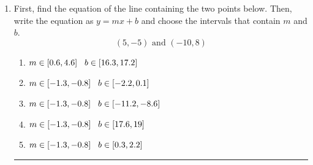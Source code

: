 \documentclass[14pt]{extbook}
\newcommand{\litem}[1]{\item#1\hspace*{-1cm}\rule{\textwidth}{0.4pt}}
\begin{document}
\begin{enumerate}
{\begin{enumerate}[label=\Alph*.]
\end{enumerate} }
\litem{
First, find the equation of the line containing the two points below. Then, write the equation as $ y=mx+b $ and choose the intervals that contain $m$ and $b$.\[ (5, -5) \text{ and } (-10, 8) \]\begin{enumerate}[label=\Alph*.]
\item \( m \in [0.6, 4.6] \hspace*{3mm} b \in [16.3, 17.2] \)
\item \( m \in [-1.3, -0.8] \hspace*{3mm} b \in [-2.2, 0.1] \)
\item \( m \in [-1.3, -0.8] \hspace*{3mm} b \in [-11.2, -8.6] \)
\item \( m \in [-1.3, -0.8] \hspace*{3mm} b \in [17.6, 19] \)
\item \( m \in [-1.3, -0.8] \hspace*{3mm} b \in [0.3, 2.2] \)

\end{enumerate} }
\end{enumerate}
\end{document}
